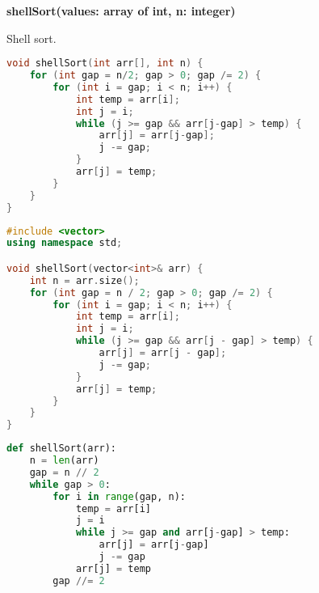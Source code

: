 \begin{center}
\begin{minipage}{.9\linewidth}
\begin{algorithm}[H]
\DontPrintSemicolon
\textbf{shellSort(values: array of int, n: integer)}

\caption{Shell sort.}
\label{lab:alg-shellSort}
\end{algorithm}
\end{minipage}
\end{center}

\begin{lstlisting}[language=C,caption={Shell sort em C},captionpos=t]
void shellSort(int arr[], int n) {
    for (int gap = n/2; gap > 0; gap /= 2) {
        for (int i = gap; i < n; i++) {
            int temp = arr[i];
            int j = i;
            while (j >= gap && arr[j-gap] > temp) {
                arr[j] = arr[j-gap];
                j -= gap;
            }
            arr[j] = temp;
        }
    }
}
\end{lstlisting}

\begin{lstlisting}[language=C++,caption={Shell sort em C++},captionpos=t]
#include <vector>
using namespace std;

void shellSort(vector<int>& arr) {
    int n = arr.size();
    for (int gap = n / 2; gap > 0; gap /= 2) {
        for (int i = gap; i < n; i++) {
            int temp = arr[i];
            int j = i;
            while (j >= gap && arr[j - gap] > temp) {
                arr[j] = arr[j - gap];
                j -= gap;
            }
            arr[j] = temp;
        }
    }
}
\end{lstlisting}

\begin{lstlisting}[language=python,caption={Shell sort em Python},captionpos=t]
def shellSort(arr):
    n = len(arr)
    gap = n // 2
    while gap > 0:
        for i in range(gap, n):
            temp = arr[i]
            j = i
            while j >= gap and arr[j-gap] > temp:
                arr[j] = arr[j-gap]
                j -= gap
            arr[j] = temp
        gap //= 2
\end{lstlisting}

